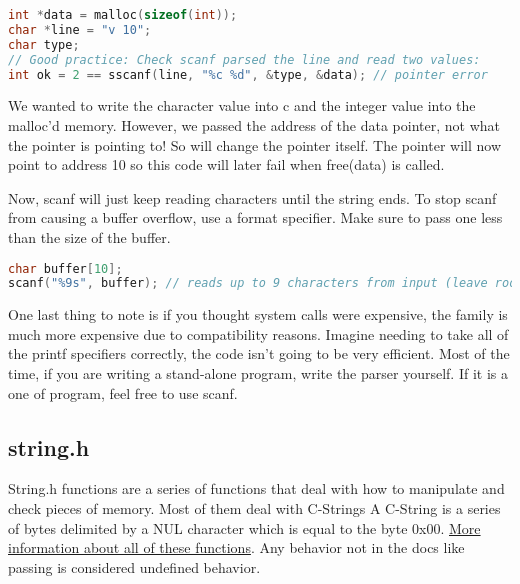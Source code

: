 \begin{lstlisting}[language=C]
int *data = malloc(sizeof(int));
char *line = "v 10";
char type;
// Good practice: Check scanf parsed the line and read two values:
int ok = 2 == sscanf(line, "%c %d", &type, &data); // pointer error
\end{lstlisting}

We wanted to write the character value into c and the integer value into the malloc'd memory.
However, we passed the address of the data pointer, not what the pointer is pointing to! So  will change the pointer itself.
The pointer will now point to address 10 so this code will later fail when free(data) is called.

Now, scanf will just keep reading characters until the string ends.
To stop scanf from causing a buffer overflow, use a format specifier.
Make sure to pass one less than the size of the buffer.

\begin{lstlisting}[language=C]
char buffer[10];
scanf("%9s", buffer); // reads up to 9 characters from input (leave room for the 10th byte to be the terminating byte)
\end{lstlisting}

One last thing to note is if you thought system calls were expensive, the  family is much more expensive due to compatibility reasons. Imagine needing to take all of the printf specifiers correctly, the code isn't going to be very efficient.
Most of the time, if you are writing a stand-alone program, write the parser yourself.
If it is a one of program, feel free to use scanf.

\subsection{string.h}

String.h functions are a series of functions that deal with how to manipulate and check pieces of memory.
Most of them deal with C-Strings
A C-String is a series of bytes delimited by a NUL character which is equal to the byte 0x00.
\href{https://linux.die.net/man/3/string}{More information about all of these functions}.
Any behavior not in the docs like passing  is considered undefined behavior.

